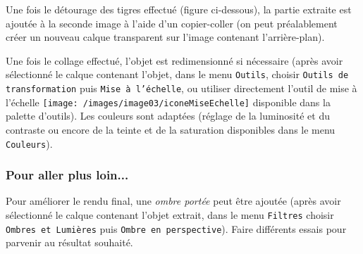 Une fois le détourage des tigres effectué (figure ci-dessous), la partie extraite est ajoutée à la seconde image à l'aide d'un copier-coller (on peut préalablement créer un nouveau calque transparent sur l'image contenant l'arrière-plan). 


Une fois le collage effectué, l'objet est redimensionné si nécessaire (après avoir sélectionné le calque contenant l'objet, dans le menu \texttt{Outils}, choisir \texttt{Outils de transformation} puis \texttt{Mise à l'échelle}, ou utiliser directement l'outil de mise à l'échelle \texttt{[image: /images/image03/iconeMiseEchelle]} disponible dans la palette d'outils). Les couleurs sont adaptées (réglage de la luminosité et du contraste ou encore de la teinte et de la saturation disponibles dans le menu \texttt{Couleurs}).

\subsubsection{Pour aller plus loin...}

Pour améliorer le rendu final, une \emph{ombre portée} peut être ajoutée (après avoir sélectionné le calque contenant l'objet extrait, dans le menu \texttt{Filtres} choisir \texttt{Ombres et Lumières} puis \texttt{Ombre en perspective}). Faire différents essais pour parvenir au résultat souhaité.




\vfill





